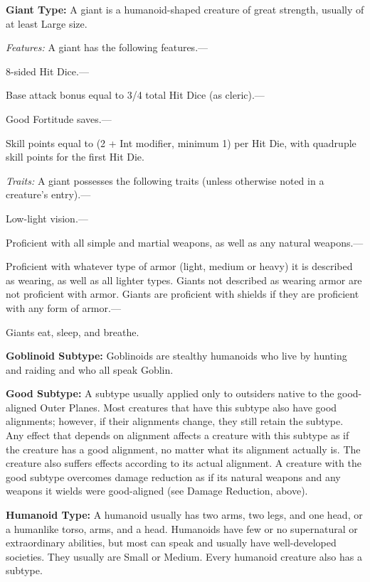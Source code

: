 \documentclass{article}
\begin{document}
\vspace{12pt}
\textbf{Giant Type:} A giant is a humanoid-shaped creature of great strength, usually 
of at least Large size.

\textit{Features: }A giant has the following features.---

8-sided Hit Dice.---

Base attack bonus equal to 3/4 total Hit Dice (as cleric).---

Good Fortitude saves.---

Skill points equal to (2 + Int modifier, minimum 1) per Hit Die, with quadruple 
skill points for the first Hit Die.

\textit{Traits: }A giant possesses the following traits (unless otherwise noted 
in a creature's entry).---

Low-light vision.---

Proficient with all simple and martial weapons, as well as any natural weapons.---

Proficient with whatever type of armor (light, medium or heavy) it is described 
as wearing, as well as all lighter types. Giants not described as wearing armor 
are not proficient with armor. Giants are proficient with shields if they are proficient 
with any form of armor.---

Giants eat, sleep, and breathe.

\vspace{12pt}
\textbf{Goblinoid Subtype:} Goblinoids are stealthy humanoids who live by hunting 
and raiding and who all speak Goblin.

\vspace{12pt}
\textbf{Good Subtype:} A subtype usually applied only to outsiders native to the 
good-aligned Outer Planes. Most creatures that have this subtype also have good 
alignments; however, if their alignments change, they still retain the subtype. 
Any effect that depends on alignment affects a creature with this subtype as if 
the creature has a good alignment, no matter what its alignment actually is. The 
creature also suffers effects according to its actual alignment. A creature with 
the good subtype overcomes damage reduction as if its natural weapons and any weapons 
it wields were good-aligned (see Damage Reduction, above).

\vspace{12pt}
\textbf{Humanoid Type: }A humanoid usually has two arms, two legs, and one head, 
or a humanlike torso, arms, and a head. Humanoids have few or no supernatural or 
extraordinary abilities, but most can speak and usually have well-developed societies. 
They usually are Small or Medium. Every humanoid creature also has a subtype.
\end{document}
